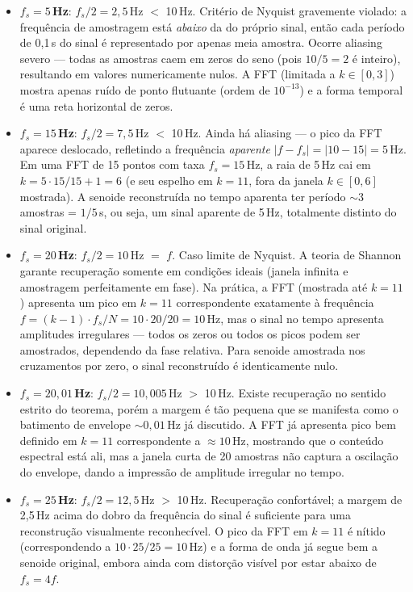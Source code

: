 \documentclass[12pt]{article}
\begin{document}
\begin{itemize}
    \item \textbf{$f_s = 5$\,Hz}: $f_s/2 = 2{,}5$\,Hz $<$ 10\,Hz. Critério de Nyquist gravemente violado: a frequência de amostragem está \emph{abaixo} da do próprio sinal, então cada período de 0{,}1\,s do sinal é representado por apenas meia amostra. Ocorre aliasing severo — todas as amostras caem em zeros do seno (pois $10/5 = 2$ é inteiro), resultando em valores numericamente nulos. A FFT (limitada a $k \in [0,3]$) mostra apenas ruído de ponto flutuante (ordem de $10^{-13}$) e a forma temporal é uma reta horizontal de zeros.

    \item \textbf{$f_s = 15$\,Hz}: $f_s/2 = 7{,}5$\,Hz $<$ 10\,Hz. Ainda há aliasing — o pico da FFT aparece deslocado, refletindo a frequência \textit{aparente} $|f - f_s| = |10-15| = 5$\,Hz. Em uma FFT de 15 pontos com taxa $f_s=15$\,Hz, a raia de 5\,Hz cai em $k = 5\cdot 15/15 + 1 = 6$ (e seu espelho em $k=11$, fora da janela $k \in [0,6]$ mostrada). A senoide reconstruída no tempo aparenta ter período ${\sim}3$ amostras = $1/5$\,s, ou seja, um sinal aparente de 5\,Hz, totalmente distinto do sinal original.

    \item \textbf{$f_s = 20$\,Hz}: $f_s/2 = 10$\,Hz $=$ $f$. Caso limite de Nyquist. A teoria de Shannon garante recuperação somente em condições ideais (janela infinita e amostragem perfeitamente em fase). Na prática, a FFT (mostrada até $k=11$) apresenta um pico em $k=11$ correspondente exatamente à frequência $f = (k-1)\cdot f_s/N = 10\cdot 20/20 = 10$\,Hz, mas o sinal no tempo apresenta amplitudes irregulares — todos os zeros ou todos os picos podem ser amostrados, dependendo da fase relativa. Para senoide amostrada nos cruzamentos por zero, o sinal reconstruído é identicamente nulo.

    \item \textbf{$f_s = 20{,}01$\,Hz}: $f_s/2 = 10{,}005$\,Hz $>$ 10\,Hz. Existe recuperação no sentido estrito do teorema, porém a margem é tão pequena que se manifesta como o batimento de envelope $\sim 0{,}01$\,Hz já discutido. A FFT já apresenta pico bem definido em $k=11$ correspondente a $\approx 10$\,Hz, mostrando que o conteúdo espectral está ali, mas a janela curta de 20 amostras não captura a oscilação do envelope, dando a impressão de amplitude irregular no tempo.

    \item \textbf{$f_s = 25$\,Hz}: $f_s/2 = 12{,}5$\,Hz $>$ 10\,Hz. Recuperação confortável; a margem de 2{,}5\,Hz acima do dobro da frequência do sinal é suficiente para uma reconstrução visualmente reconhecível. O pico da FFT em $k=11$ é nítido (correspondendo a $10\cdot 25/25=10$\,Hz) e a forma de onda já segue bem a senoide original, embora ainda com distorção visível por estar abaixo de $f_s = 4f$.


\end{itemize}
\end{document}
